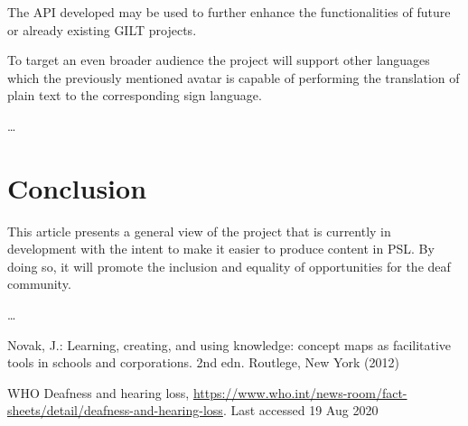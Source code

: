 \documentclass[runningheads]{llncs}
\begin{document}
The API developed may be used to further enhance the functionalities of future or already existing GILT projects.

To target an even broader audience the project will support other languages which the previously mentioned avatar is capable of performing the translation of plain text to the corresponding sign language.

\dots

\section{Conclusion}

This article presents a general view of the project that is currently in development with the intent to make it easier to produce content in PSL.
By doing so, it will promote the inclusion and equality of opportunities for the deaf community.

\dots

%
%
%
% 
% 
%
\begin{thebibliography}{8}
Novak, J.: Learning, creating, and using knowledge: concept maps as facilitative tools in schools and corporations. 2nd edn. Routlege, New York (2012)

WHO Deafness and hearing loss, \url{https://www.who.int/news-room/fact-sheets/detail/deafness-and-hearing-loss}. Last accessed 19 Aug 2020





\end{thebibliography}
\end{document}
